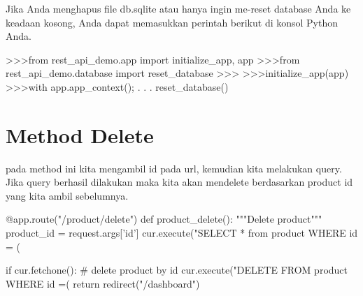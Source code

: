 Jika Anda menghapus file db.sqlite atau hanya ingin me-reset database Anda ke keadaan kosong, Anda dapat memasukkan perintah berikut di konsol Python Anda.

	>>>from rest_api_demo.app import initialize_app, app
	>>>from rest_api_demo.database import reset_database
	>>>
	>>>initialize_app(app)
	>>>with app.app_context();
	. . .	reset_database()

\section{Method Delete}
pada method ini kita mengambil id pada url, kemudian kita melakukan query. Jika query berhasil dilakukan maka kita akan mendelete berdasarkan product id yang kita ambil sebelumnya.

@app.route("/product/delete")
def product_delete():
    """Delete product"""
    product_id = request.args['id']
    cur.execute("SELECT * from product WHERE id = (%

    if cur.fetchone():
        # delete product by id
        cur.execute("DELETE FROM product WHERE id =(%
    return redirect("/dashboard")




